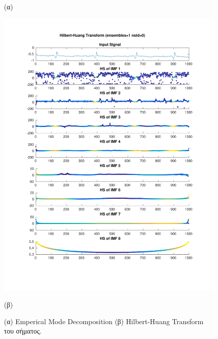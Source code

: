 \documentclass[11pt,a4paper]{article}
\begin{document}
\begin{figure}[H]
\begin{minipage}{0.48\textwidth}
	(α)
\end{minipage}
\begin{minipage}{0.48\textwidth}
	\centering
	\includegraphics[width=\textwidth]{fig/112l2_hht.pdf}
	
	(β)
\end{minipage}
\vfill
\caption{(α) Emperical Mode Decomposition (β) Hilbert-Huang Transform του σήματος.}
\label{fig:112l2_hht}
\end{figure}
\end{document}
